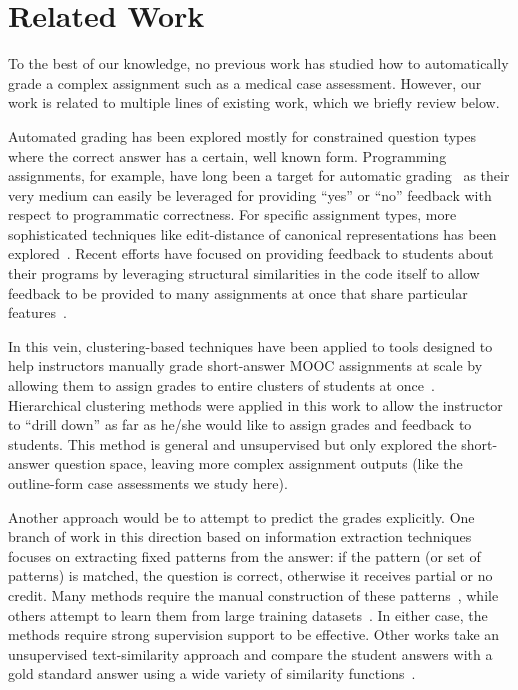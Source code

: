 \section{Related Work}

To the best of our knowledge, no previous work has studied how to automatically grade
a complex assignment such as a medical case assessment. However, our work
is related to multiple lines of existing work, which we briefly review below. 

Automated grading has been explored mostly for constrained question
types where the correct answer has a certain, well known form. Programming
assignments, for example, have long been a target for automatic
grading~\cite{Forsythe:1965:CACM, Helmick:2007:ITICSE} as their very medium
can easily be leveraged for providing ``yes'' or ``no'' feedback with
respect to programmatic correctness. For specific assignment types, more
sophisticated techniques like edit-distance of canonical representations
has been explored~\cite{Alur:2013:IJCAI}. Recent efforts have focused on
providing feedback to students about their programs by leveraging
structural similarities in the code itself to allow feedback to be provided
to many assignments at once that share particular
features~\cite{Nguyen:2014:WWW, Piech:2015:ICML}.

In this vein, clustering-based techniques have been applied to tools
designed to help instructors manually grade short-answer MOOC assignments
at scale by allowing them to assign grades to entire clusters of students
at once~\cite{Brooks:2014:Powergrading}. Hierarchical clustering methods
were applied in this work to allow the instructor to ``drill down'' as far
as he/she would like to assign grades and feedback to students. This method
is general and unsupervised but only explored the short-answer question
space, leaving more complex assignment outputs (like the outline-form case
assessments we study here).

Another approach would be to attempt to predict the grades explicitly. One
branch of work in this direction based on information extraction techniques
focuses on extracting fixed patterns from the answer: if the pattern (or
set of patterns) is matched, the question is correct, otherwise it receives
partial or no credit. Many methods require the manual construction of these
patterns~\cite{Mitchell:2002:ICAA, Leacock:2003:CatH}, while others attempt to
learn them from large training datasets~\cite{Pulman:2005:EdAppsNLP}. In either
case, the methods require strong supervision support to be effective.  Other
works take an unsupervised text-similarity approach and compare the student
answers with a gold standard answer using a wide variety of similarity
functions~\cite{Mohler:2009:EACL}.

